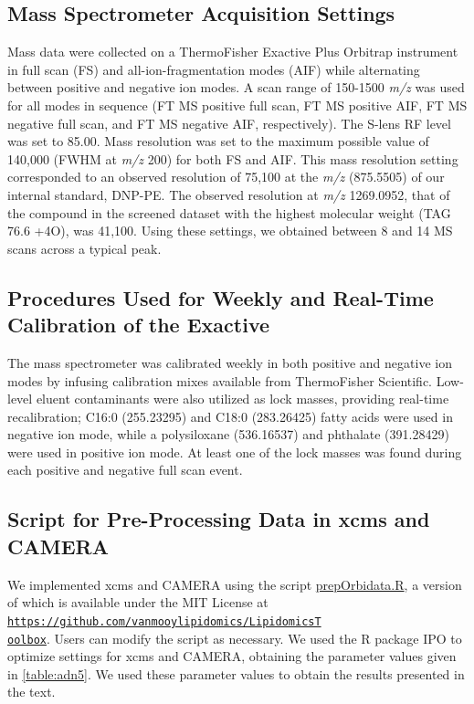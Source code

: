 \subsection{Mass Spectrometer Acquisition Settings}

Mass data were collected on a ThermoFisher Exactive Plus Orbitrap instrument in full scan (FS) and all-ion-fragmentation modes (AIF) while alternating between positive and negative ion modes. A scan range of 150-1500 \emph{m/z} was used for all modes in sequence (FT MS positive full scan, FT MS positive AIF, FT MS negative full scan, and FT MS negative AIF, respectively). The S-lens RF level was set to 85.00. Mass resolution was set to the maximum possible value of 140,000 (FWHM at \emph{m/z} 200) for both FS and AIF. This mass resolution setting corresponded to an observed resolution of 75,100 at the \emph{m/z} (875.5505) of our internal standard, DNP-PE. The observed resolution at \emph{m/z} 1269.0952, that of the compound in the screened dataset with the highest molecular weight (TAG 76.6 +4O), was 41,100. Using these settings, we obtained between 8 and 14 MS scans across a typical peak.

\subsection{Procedures Used for Weekly and Real-Time Calibration of the Exactive}

The mass spectrometer was calibrated weekly in both positive and negative ion modes by infusing calibration mixes available from ThermoFisher Scientific. Low-level eluent contaminants were also utilized as lock masses, providing real-time recalibration; C16:0 (255.23295) and C18:0 (283.26425) fatty acids were used in negative ion mode, while a polysiloxane (536.16537) and phthalate (391.28429) were used in positive ion mode. At least one of the lock masses was found during each positive and negative full scan event.

\subsection{Script for Pre-Processing Data in xcms and CAMERA}

We implemented xcms and CAMERA using the script \href{https://github.com/vanmooylipidomics/LipidomicsToolbox/blob/master/prepOrbidata.R}{prepOrbidata.R}, a version of which is available under the MIT License at \texttt{\href{https://github.com/vanmooylipidomics/LipidomicsToolbox}{https://github.com/vanmooylipidomics/LipidomicsT\\oolbox}}. Users can modify the script as necessary. We used the R package IPO to optimize settings for xcms and CAMERA, obtaining the parameter values given in \autoref{table:adn5}. We used these parameter values to obtain the results presented in the text.

